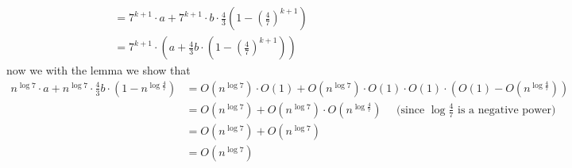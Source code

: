 \documentclass{article}
\begin{document}
\begin{enumerate}
{\begin{enumerate}[label={(\arabic*)}]
{\begin{displaymath}
\begin{aligned}
                            &= 7^{k + 1} \cdot a + 7^{k + 1} \cdot b \cdot \frac{4}{3}\left(1 - \left(\frac47\right)^{k + 1}\right) \\
                            &= 7^{k + 1} \cdot \left( a + \frac{4}{3}b \cdot \left(1 - \left(\frac47\right)^{k + 1}\right)\right)
                        \end{aligned}
                    \end{displaymath}
                    now we with the lemma we show that
                    \begin{displaymath}
                        \begin{aligned}
                            n^{\log7}\cdot a + n^{\log7}\cdot\frac{4}{3}b\cdot\left( 1 - n^{\log\frac47} \right)
                            &= O(n^{\log7}) \cdot O(1) + O(n^{\log7}) \cdot O(1) \cdot O(1) \cdot \left(O(1) - O(n^{\log\frac47})\right) \\
                            &= O(n^{\log7}) + O(n^{\log7}) \cdot O(n^{\log\frac47}) \quad \text{ (since \(\log\frac47\) is a negative power)}\\
                            &= O(n^{\log7}) + O(n^{\log7}) \\
                            &= O(n^{\log7}) \\
                        \end{aligned}
                    \end{displaymath}
                }
            \end{enumerate}
        }
    \end{enumerate}
\end{document}
